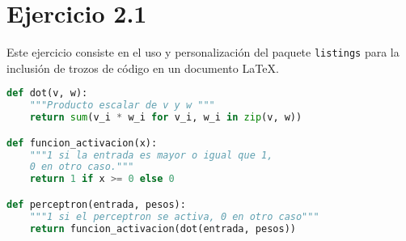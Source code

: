 \chapter{Ejercicio 2.1}

Este ejercicio consiste en el uso y personalización del paquete \texttt{listings} para la inclusión de trozos de código en un documento \LaTeX.

\begin{lstlisting}[language=python, caption={Implementación de un perceptrón}, captionpos=b]
def dot(v, w):
    """Producto escalar de v y w """
    return sum(v_i * w_i for v_i, w_i in zip(v, w))

def funcion_activacion(x):
    """1 si la entrada es mayor o igual que 1,
    0 en otro caso."""
    return 1 if x >= 0 else 0

def perceptron(entrada, pesos):
    """1 si el perceptron se activa, 0 en otro caso"""
    return funcion_activacion(dot(entrada, pesos))
 \end{lstlisting}